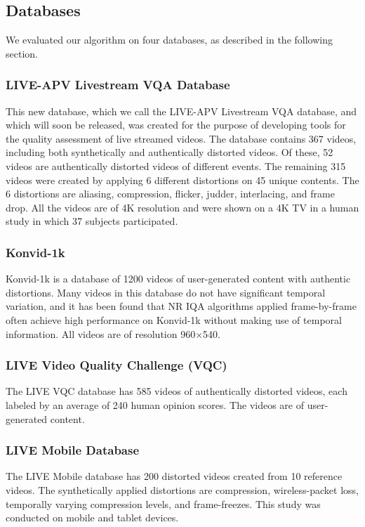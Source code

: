 \documentclass[conference]{IEEEtran}
\begin{document}
\subsection{Databases}
We evaluated our algorithm on four databases, as described in the following section.
\subsubsection{LIVE-APV Livestream VQA Database} This new database, which we call the LIVE-APV Livestream VQA database, and which will soon be released, was created for the purpose of developing tools for the quality assessment of live streamed videos. The database contains 367 videos, including both synthetically and authentically distorted videos. Of these, 52 videos are authentically distorted videos of different events. The remaining 315 videos were created by applying 6 different distortions on 45 unique contents. The 6 distortions are aliasing, compression, flicker, judder, interlacing, and frame drop. All the videos are of 4K resolution and were shown on a 4K TV in a human study in which 37 subjects participated.

\subsubsection{Konvid-1k} Konvid-1k\cite{konvid} is a database of 1200 videos of user-generated content with authentic distortions. Many videos in this database do not have significant temporal variation, and it has been found that NR IQA algorithms applied frame-by-frame often achieve high performance on Konvid-1k without making use of temporal information. All videos are of resolution 960$\times$540.

\subsubsection{LIVE Video Quality Challenge (VQC)} The LIVE VQC database\cite{vqc} has 585 videos of authentically distorted videos, each labeled by an average of 240 human opinion scores. The videos are of user-generated content.
\subsubsection{LIVE Mobile Database} The LIVE Mobile\cite{livemobile} database has 200 distorted videos created from 10 reference videos. The synthetically applied distortions are compression, wireless-packet loss, temporally varying compression levels, and frame-freezes. This study was conducted on mobile and tablet devices.
\end{document}
